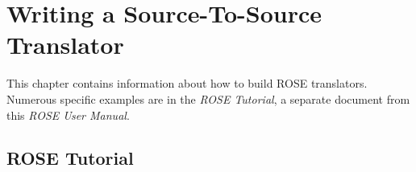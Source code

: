\chapter{Writing a Source-To-Source Translator}

\label{writingYourFirstTranslator:writingYourFirstTranslator}


This chapter contains information about how to build ROSE translators.
Numerous specific examples are in the {\em ROSE Tutorial}, a separate document
from this {\em ROSE User Manual}.

\section{ROSE Tutorial}


